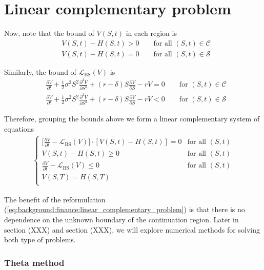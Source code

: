 \section{Linear complementary problem}


Now, note that the bound of $V(S, t)$ in each region is
\begin{align*}
  &V(S, t) - H(S, t) > 0 \qquad \text{for all $(S,t) \in \mathcal{C}$} \\ 
  &V(S, t) - H(S, t) = 0 \qquad \text{for all $(S,t) \in \mathcal{S}$}
\end{align*}

Similarly, the bound of $\mathcal{L}_{\text{BS}}(V)$ is
\begin{align*}
  &\frac{\partial{V}}{\partial{t}} + \frac{1}{2}\sigma^{2} S^2 \frac{\partial^2{V}}{\partial{S^2}} + (r - \delta)S \frac{\partial{V}}{\partial{S}} - rV = 0 \qquad \text{for $(S,t) \in \mathcal{C}$} \\
  &\frac{\partial{V}}{\partial{t}} + \frac{1}{2}\sigma^{2} S^2 \frac{\partial^2{V}}{\partial{S^2}} + (r - \delta)S \frac{\partial{V}}{\partial{S}} - rV < 0 \qquad \text{for $(S,t) \in \mathcal{S}$}
\end{align*}

Therefore, grouping the bounds above we form a linear complementary system of equations
{
  \color{red}  
  \begin{align}
    \begin{cases}
      \big[\frac{\partial V}{\partial t} - \mathcal{L}_{\text{BS}}(V)\big] \cdot [V(S,t) - H(S,t)] = 0 & \text{for all $(S,t)$} \\
      V(S, t) - H(S, t) \ge 0 & \text{for all $(S, t)$}\\
      \frac{\partial V}{\partial t} - \mathcal{L}_{\text{BS}}(V) \le 0 &  \text{for all $(S, t)$}\\
      V(S, T) = H(S, T) \\  
    \end{cases}
    \label{eq:background:finance:linear_complementary_problem}
  \end{align}
}

The benefit of the reformulation (\ref*{eq:background:finance:linear_complementary_problem})
is that there is no dependence on the unknown boundary of the continuation region.
Later in section (XXX) and section (XXX), we will explore numerical methods for solving 
both type of problems.


\subsubsection{Theta method}

